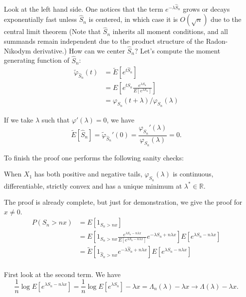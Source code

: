 Look at the left hand side. One notices that the term $e^{-\lambda \hat S_n}$ grows or decays exponentially fast unless $\hat S_n$ is centered, in which case it is $O(\sqrt{n})$ due to the central limit theorem (Note that $\hat S_n$ inherits all moment conditions, and all summands remain independent due to the product structure of the Radon-Nikodym derivative.) How can we center $\hat S_n$? Let's compute the moment generating function of $\hat S_n$:
\begin{align*}
    \tilde \varphi_{\hat S_n}(t) &= \tilde E \left[ e^{t \hat S_n} \right] \\
    &= E \left[ e^{t S_n} \frac{e^{\lambda S_n}}{E \left[ e^{\lambda S_n} \right]} \right] \\
    &= \varphi_{S_n}(t + \lambda) / \varphi_{S_n}(\lambda)
\end{align*}

If we take $\lambda$ such that $\varphi'(\lambda) = 0$, we have
\[
    \tilde E[\hat S_n] = \tilde \varphi_{\hat S_n}'(0) = \frac{\varphi_{S_n}'(\lambda)}{\varphi_{S_n}(\lambda)} = 0.
\]

To finish the proof one performs the following sanity checks:
\begin{tcolorbox}[]
    \item When $X_1$ has both positive and negative tails, $\varphi_{S_n}(\lambda)$ is continuous, differentiable, strictly convex and has a unique minimum at $\lambda^* \in \mathbb{R}$. 
\end{tcolorbox}

The proof is already complete, but just for demonstration, we give the proof for $x \neq 0$. 
\begin{align*}
    P\left( S_n > n x \right)
    &= E\left[ 1_{S_n > n x} \right] \\
    &= E\left[ 1_{S_n > n x} \frac{e^{\lambda S_n - n \lambda x}}{ E \left[ e^{\lambda S_n - n \lambda x} \right]} e^{-\lambda S_n + n \lambda x} \right] E \left[ e^{\lambda S_n - n \lambda x} \right] \\
    &= \tilde E \left[ 1_{\hat S_n > n x} e^{-\lambda \hat S_n + n \lambda x} \right] E \left[ e^{\lambda S_n - n \lambda x} \right] \\
\end{align*}

First look at the second term. We have
\[
    \frac{1}{n} \log E \left[ e^{\lambda S_n - n \lambda x} \right] = \frac{1}{n} \log E \left[ e^{\lambda S_n} \right] - \lambda x = \Lambda_n(\lambda) - \lambda x
    \to \Lambda(\lambda) - \lambda x.
\]


